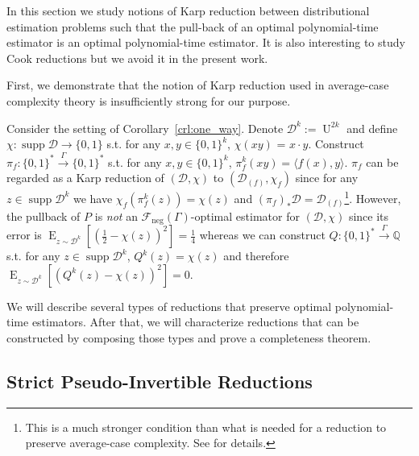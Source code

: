 \documentclass{article}
\numberwithin{equation}{section}
\theoremstyle{definition}
\theoremstyle{plain}
\newcommand{\Bool}{\{0,1\}}
\newcommand{\Words}{{\Bool^*}}
\DeclareMathOperator{\Supp}{supp}
\DeclareMathOperator{\E}{E}
\DeclareMathOperator{\Un}{U}
\newcommand{\Rats}{\mathbb{Q}}
\newcommand{\Chev}[1]{\langle #1 \rangle}
\newcommand{\Dist}{\mathcal{D}}
\newcommand{\Fall}{\mathcal{F}}
\newcommand{\Scheme}{\xrightarrow{\Gamma}}
\begin{document}
In this section we study notions of Karp reduction between distributional estimation problems such that the pull-back of an optimal polynomial-time estimator is an optimal polynomial-time estimator. It is also interesting to study Cook reductions but we avoid it in the present work.

First, we demonstrate that the notion of Karp reduction used in average-case complexity theory is insufficiently strong for our purpose. 

Consider the setting of Corollary~\ref{crl:one_way}. Denote $\Dist^k:=\Un^{2k}$ and define ${\chi: \Supp \Dist \rightarrow \Bool}$ s.t. for any $x,y \in \Bool^k$, $\chi(xy)$ = $x \cdot y$. Construct $\pi_f: \Words \Scheme \Words$ s.t. for any $x,y \in \Bool^k$, ${\pi_f^k(xy) = \Chev{f(x),y}}$. $\pi_f$ can be regarded as a Karp reduction of $(\Dist, \chi)$ to $(\Dist_{(f)},\chi_f)$ since for any ${z \in \Supp \Dist^k}$ we have $\chi_f(\pi_f^k(z))=\chi(z)$ and $(\pi_f)_*\Dist=\Dist_{(f)}$\footnote{This is a much stronger condition than what is needed for a reduction to preserve average-case complexity. See \cite{Bogdanov_2006} for details.}. However, the pullback of $P$ is \emph{not} an $\Fall_{\text{neg}}(\Gamma)$-optimal estimator for $(\Dist,\chi)$ since its error is $\E_{z \sim \Dist^k}[(\frac{1}{2}-\chi(z))^2]=\frac{1}{4}$ whereas we can construct $Q: \Words \Scheme \Rats$ s.t. for any $z \in \Supp \Dist^k$, $Q^k(z)=\chi(z)$ and therefore $\E_{z \sim \Dist^k}[(Q^k(z)-\chi(z))^2]=0$.

We will describe several types of reductions that preserve optimal polynomial-time estimators. After that, we will characterize reductions that can be constructed by composing those types and prove a completeness theorem.

\subsection{Strict Pseudo-Invertible Reductions}
\end{document}
